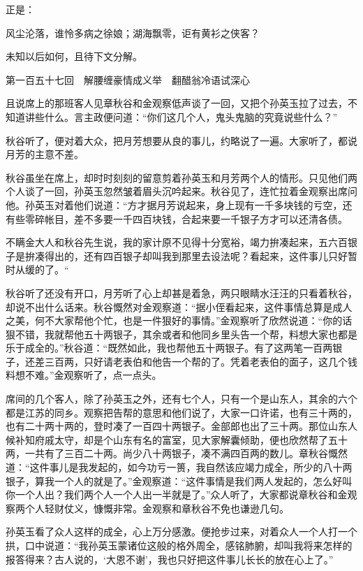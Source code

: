 \documentclass[12pt,UTF8]{ctexbook}
\begin{document}
{{{正是：

风尘沦落，谁怜多病之徐娘；湖海飘零，讵有黄衫之侠客？

未知以后如何，且待下文分解。





第一百五十七回　解腰缠豪情成义举　翻醋翁冷语试深心





且说席上的那班客人见章秋谷和金观察低声谈了一回，又把个孙英玉拉了过去，不知道讲些什么。言主政便问道：“你们这几个人，鬼头鬼脑的究竟说些什么？”

秋谷听了，便对着大众，把月芳想要从良的事儿，约略说了一遍。大家听了，都说月芳的主意不差。

秋谷虽坐在席上，却时时刻刻的留意剪着孙英玉和月芳两个人的情形。只见他们两个人谈了一回，孙英玉忽然皱着眉头沉吟起来。秋谷见了，连忙拉着金观察出席问他。孙英玉对着他们说道：“方才据月芳说起来，身上现有一千多块钱的亏空，还有些零碎帐目，差不多要一千四百块钱，合起来要一千银子方才可以还清各债。

不瞒金大人和秋谷先生说，我的家计原不见得十分宽裕，竭力拚凑起来，五六百银子是拚凑得出的，还有四百银子却叫我到那里去设法呢？看起来，这件事儿只好暂时从缓的了。“

秋谷听了还没有开口，月芳听了心上却甚是着急，两只眼睛水汪汪的只看着秋谷，却说不出什么话来。秋谷慨然对金观察道：“据小侄看起来，这件事情总算是成人之美，何不大家帮他个忙，也是一件狠好的事情。”金观察听了欣然说道：“你的话狠不错，我就帮他五十两银子，其余或者和他同乡里头告一个帮，料想大家也都是乐于成全的。”秋谷道：“既然如此，我也帮他五十两银子。有了这两笔一百两银子，还差三百两，只好请老表伯和他告一个帮的了。凭着老表伯的面子，这几个钱料想不难。”金观察听了，点一点头。

席间的几个客人，除了孙英玉之外，还有七个人，只有一个是山东人，其余的六个都是江苏的同乡。观察把告帮的意思和他们说了，大家一口许诺，也有三十两的，也有二十两十两的，登时凑了一百四十两银子。金部郎也出了三十两。那位山东人候补知府戚太守，却是个山东有名的富室，见大家解囊倾助，便也欣然帮了五十两，一共有了三百二十两。尚少八十两银子，凑不满四百两的数儿。章秋谷慨然道：“这件事儿是我发起的，如今功亏一篑，我自然该应竭力成全，所少的八十两银子，算我一个人的就是了。”金观察道：“这件事情是我们两人发起的，怎么好叫你一个人出？我们两个人一个人出一半就是了。”众人听了，大家都说章秋谷和金观察两个人轻财仗义，慷慨非常。金观察和章秋谷不免也谦逊几句。

孙英玉看了众人这样的成全，心上万分感激。便抢步过来，对着众人一个人打一个拱，口中说道：“我孙英玉蒙诸位这般的格外周全，感铭肺腑，却叫我将来怎样的报答得来？古人说的，‘大恩不谢’，我也只好把这件事儿长长的放在心上了。”

}}}
\end{document}
